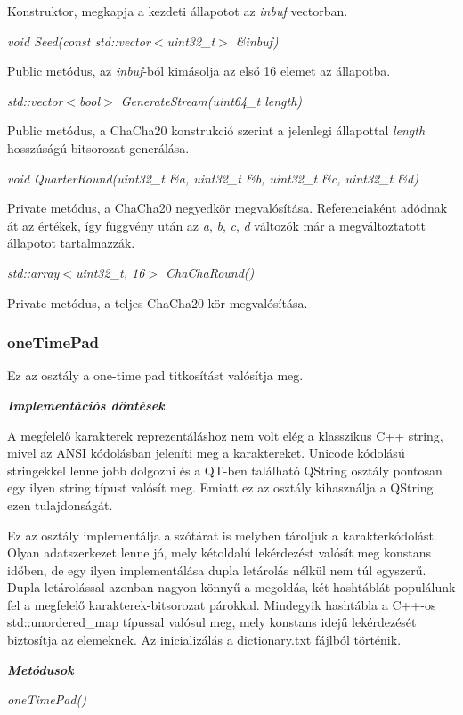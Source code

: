 \documentclass[12pt]{article}
\begin{document}
Konstruktor, megkapja a kezdeti állapotot az \textit{inbuf} vectorban.

\textit{void Seed(const std::vector$<$uint32\_t$>$ \&inbuf)}

Public metódus, az \textit{inbuf}-ból kimásolja az első 16 elemet az állapotba.

\textit{std::vector$<$bool$>$ GenerateStream(uint64\_t length)}

Public metódus, a ChaCha20 konstrukció szerint a jelenlegi állapottal \textit{length} hosszúságú bitsorozat generálása.

\textit{void QuarterRound(uint32\_t \&a, uint32\_t \&b, uint32\_t \&c, uint32\_t \&d)}

Private metódus, a ChaCha20 negyedkör megvalósítása. Referenciaként adódnak át az értékek, így függvény után az \textit{a}, \textit{b}, \textit{c}, \textit{d} változók már a megváltoztatott állapotot tartalmazzák.

\textit{std::array$<$uint32\_t, 16$>$ ChaChaRound()}

Private metódus, a teljes ChaCha20 kör megvalósítása.

\subsubsection*{oneTimePad}
Ez az osztály a one-time pad titkosítást valósítja meg.

\textit{\textbf{Implementációs döntések}}

A megfelelő karakterek reprezentáláshoz nem volt elég a klasszikus C++ string, mivel az ANSI kódolásban jeleníti meg a karaktereket. Unicode kódolású stringekkel lenne jobb dolgozni és a QT-ben található QString osztály pontosan egy ilyen string típust valósít meg. Emiatt ez az osztály kihasználja a QString ezen tulajdonságát.

Ez az osztály implementálja a szótárat is melyben tároljuk a karakterkódolást. Olyan adatszerkezet lenne jó, mely kétoldalú lekérdezést valósít meg konstans időben, de egy ilyen implementálása dupla letárolás nélkül nem túl egyszerű. Dupla letárolással azonban nagyon könnyű a megoldás, két hashtáblát populálunk fel a megfelelő karakterek-bitsorozat párokkal. Mindegyik hashtábla a C++-os std::unordered\_map típussal valósul meg, mely konstans idejű lekérdezését biztosítja az elemeknek. Az inicializálás a dictionary.txt fájlból történik.

\textit{\textbf{Metódusok}}

\textit{oneTimePad()}
\end{document}
